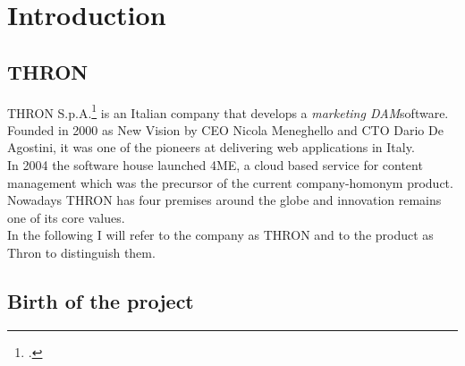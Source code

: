 
\chapter{Introduction}
\label{chap:introduction}


\section{THRON}

THRON S.p.A.\footcite{www.thron.com} is an Italian company that develops a \emph{\gls{marketing DAM}}\glsfirstoccur software. Founded in 2000 as New Vision by CEO Nicola Meneghello and CTO Dario De Agostini, it was one of the pioneers at delivering web applications in Italy. \\
In 2004 the software house launched 4ME, a cloud based service for content management which was the precursor of the current company-homonym product. \\
Nowadays THRON has four premises around the globe and innovation remains one of its core values.\\
In the following I will refer to the company as THRON and to the product as Thron to distinguish them.

\section{Birth of the project}

